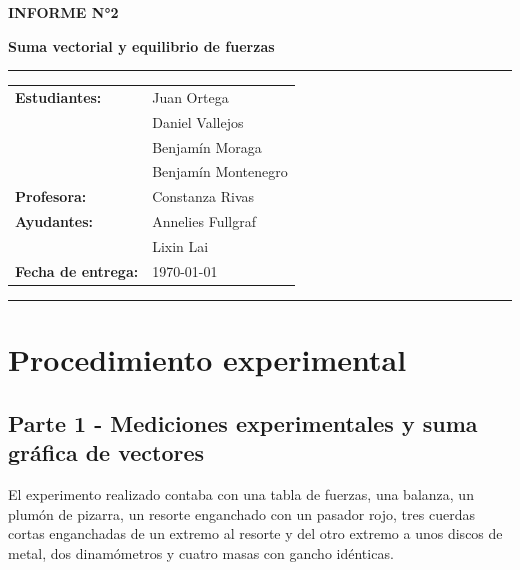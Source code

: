 \documentclass[12pt,a4paper]{article}
\begin{document}
\begin{center}
{\Large\textbf{INFORME N°2}}

{\LARGE\textbf{Suma vectorial y equilibrio de fuerzas}}

\rule{\textwidth}{0.5pt}

\begin{tabular}{ll}
    \textbf{Estudiantes:} & Juan Ortega \\
                          & Daniel Vallejos \\
                          & Benjamín Moraga \\
                          & Benjamín Montenegro \\[0.2cm]
    \textbf{Profesora:}   & Constanza Rivas \\
    \textbf{Ayudantes:}    & Annelies Fullgraf \\
                                      & Lixin Lai \\[0.2cm]
    \textbf{Fecha de entrega:} & \today
\end{tabular}

\vspace{0.4cm}
\rule{\textwidth}{0.5pt}

\end{center}

\section{Procedimiento experimental}

\subsection{Parte 1 - Mediciones experimentales y suma gráfica de vectores} \label{Procedimiento-Parte-1}

El experimento realizado contaba con una tabla de fuerzas, una balanza, un plumón de pizarra, un resorte enganchado con un pasador rojo, tres cuerdas cortas enganchadas de un extremo al resorte y del otro extremo a unos discos de metal, dos dinamómetros y cuatro masas con gancho idénticas.
\end{document}
